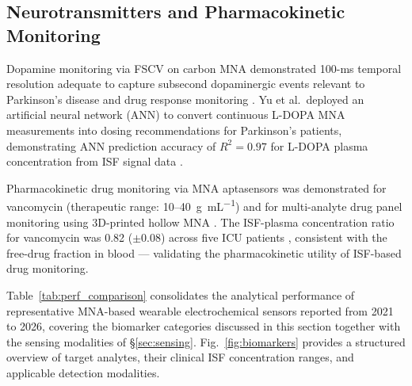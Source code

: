 \documentclass[review,1p]{elsarticle}
\begin{document}
\subsection{Neurotransmitters and Pharmacokinetic Monitoring}
\label{subsec:neuro_pk}

Dopamine monitoring via FSCV on carbon MNA demonstrated 100-ms temporal resolution adequate to capture subsecond dopaminergic events relevant to Parkinson's disease and drug response monitoring \cite{Rush2021FSCV}. Yu et al.\ deployed an artificial neural network (ANN) to convert continuous L-DOPA MNA measurements into dosing recommendations for Parkinson's patients, demonstrating ANN prediction accuracy of $R^2 = 0.97$ for L-DOPA plasma concentration from ISF signal data \cite{Yu2022ANN}.

Pharmacokinetic drug monitoring via MNA aptasensors was demonstrated for vancomycin (therapeutic range: 10--40~\textmu{}g~mL\textsuperscript{$-1$}) \cite{Zhao2021Vanc, Hashtroud2022Vanc} and for multi-analyte drug panel monitoring using 3D-printed hollow MNA \cite{Reynoso2024}. The ISF-plasma concentration ratio for vancomycin was 0.82 ($\pm$0.08) across five ICU patients \cite{Hashtroud2022Vanc}, consistent with the free-drug fraction in blood — validating the pharmacokinetic utility of ISF-based drug monitoring.


Table~\ref{tab:perf_comparison} consolidates the analytical performance of representative MNA-based wearable electrochemical sensors reported from 2021 to 2026, covering the biomarker categories discussed in this section together with the sensing modalities of \S\ref{sec:sensing}. Fig.~\ref{fig:biomarkers} provides a structured overview of target analytes, their clinical ISF concentration ranges, and applicable detection modalities.
\end{document}
